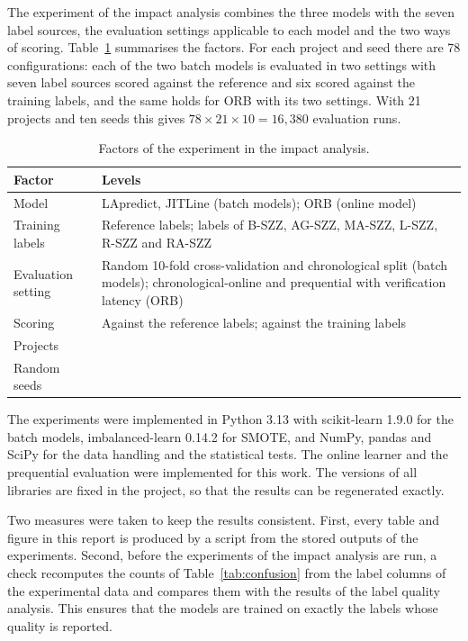 \documentclass[12pt,a4paper,oneside]{report}
\begin{document}
The experiment of the impact analysis combines the three models with the
seven label sources, the evaluation settings applicable to each model and
the two ways of scoring. Table~\ref{tab:design} summarises the factors. For
each project and seed there are 78 configurations: each of the two batch
models is evaluated in two settings with seven label sources scored against
the reference and six scored against the training labels, and the same holds
for ORB with its two settings. With 21 projects and ten seeds this gives
$78 \times 21 \times 10 = 16{,}380$ evaluation runs.

\begin{table}[htbp]
\centering\small
\caption{Factors of the experiment in the impact analysis.}
\label{tab:design}
\begin{tabularx}{\linewidth}{@{}l>{\raggedright\arraybackslash}X@{}}
\toprule
Factor & Levels \\
\midrule
Model & LApredict, JITLine (batch models); ORB (online model) \\
Training labels & Reference labels; labels of B-SZZ, AG-SZZ, MA-SZZ, L-SZZ,
R-SZZ and RA-SZZ \\
Evaluation setting & Random 10-fold cross-validation and chronological split
(batch models); chronological-online and prequential with verification
latency (ORB) \\
Scoring & Against the reference labels; against the training labels \\
Projects & 21 \\
Random seeds & 10 \\
\bottomrule
\end{tabularx}
\end{table}

The experiments were implemented in Python 3.13 with scikit-learn 1.9.0 for
the batch models, imbalanced-learn 0.14.2 for SMOTE, and NumPy, pandas and
SciPy for the data handling and the statistical tests. The online learner
and the prequential evaluation were implemented for this work. The versions
of all libraries are fixed in the project, so that the results can be
regenerated exactly.

Two measures were taken to keep the results consistent. First, every table
and figure in this report is produced by a script from the stored outputs of
the experiments. Second, before the experiments of the impact analysis are
run, a check recomputes the counts of Table~\ref{tab:confusion} from the
label columns of the experimental data and compares them with the results of
the label quality analysis. This ensures that the models are trained on
exactly the labels whose quality is reported.
\end{document}
